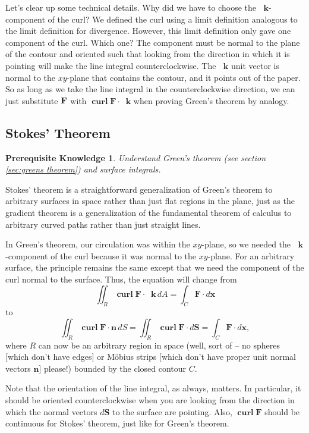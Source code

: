 \documentclass{myarticle}
\let\div\relax %
\DeclareMathOperator{\div}{div}
\DeclareMathOperator{\curl}{\mathbf{curl}}
\renewcommand{\vec}[1]{\mathbf{#1}}
\newcommand{\unitvector}[1]{
  \mathop{}\!\vec{#1}
}
\newcommand{\kh}{\unitvector{k}}
\theoremstyle{nospace}
\newtheorem*{oldprereq}{Prerequisite Knowledge}
\newenvironment{prereq}
{\begin{mdframed}\begin{oldprereq}}
    {\end{oldprereq}\end{mdframed}}
\newtheorem{old series theorem}{Theorem}
\newenvironment{series theorem}
{\begin{mdframed}\begin{old series theorem}}
    {\end{old series theorem}\end{mdframed}}
\begin{document}
Let's clear up some technical details. Why did we have to choose the
$\kh$-component of the curl? We defined the curl using a limit
definition analogous to the limit definition for divergence. However,
this limit definition only gave one component of the curl. Which one?
The component must be normal to the plane of the contour and oriented
such that looking from the direction in which it is pointing will make
the line integral counterclockwise. The $\kh$ unit vector is normal to
the $xy$-plane that contains the contour, and it points out of the
paper. So as long as we take the line integral in the counterclockwise
direction, we can just substitute $\div \vec{F}$ with
$\curl \vec{F} \cdot \kh$ when proving Green's theorem by analogy.

\subsection{Stokes' Theorem}
\label{sec:stokes theorem}

\begin{prereq}
  Understand Green's theorem (see section \ref{sec:greens theorem})
  and surface integrals.
\end{prereq}

Stokes' theorem is a straightforward generalization of Green's theorem
to arbitrary surfaces in space rather than just flat regions in the
plane, just as the gradient theorem is a generalization of the
fundamental theorem of calculus to arbitrary curved paths rather than
just straight lines.

In Green's theorem, our circulation was within the $xy$-plane, so we
needed the $\kh$-component of the curl because it was normal to the
$xy$-plane. For an arbitrary surface, the principle remains the same
except that we need the component of the curl normal to the surface.
Thus, the equation will change from
\[
  \iint_R \curl \vec{F} \cdot \kh \,dA
  = \int_C \vec{F} \cdot d\vec{x}
\]
to
\[
  \iint_R \curl \vec{F} \cdot \vec{n} \,dS
  = \iint_R \curl \vec{F} \cdot d\vec{S}
  = \int_C \vec{F} \cdot d\vec{x},
\]
where $R$ can now be an arbitrary region in space (well, sort of -- no
spheres [which don't have edges] or M\"obius strips [which don't have
proper unit normal vectors $\vec{n}$] please!) bounded by the closed
contour $C$.

Note that the orientation of the line integral, as always, matters. In
particular, it should be oriented counterclockwise when you are
looking from the direction in which the normal vectors $d\vec{S}$ to
the surface are pointing. Also, $\curl \vec{F}$ should be continuous
for Stokes' theorem, just like for Green's theorem.
\end{document}
